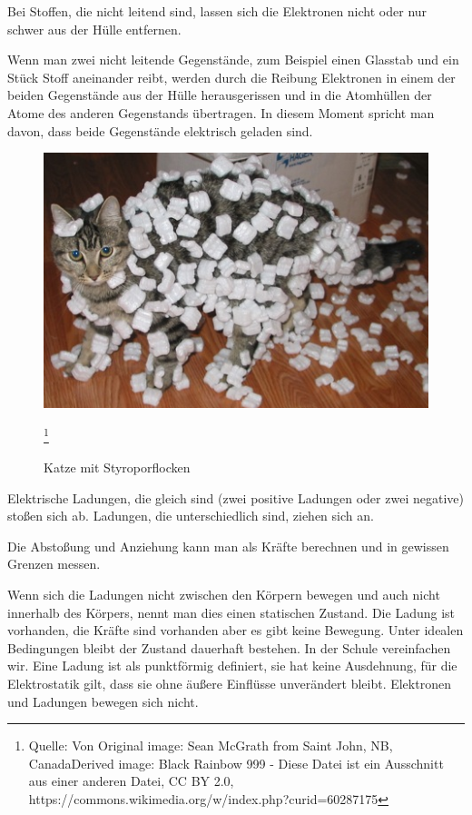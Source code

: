 \documentclass[a4paper,10pt]{scrreprt}
\begin{document}
Bei Stoffen, die nicht leitend sind, lassen sich die Elektronen nicht oder nur schwer aus der Hülle entfernen.

Wenn man zwei nicht leitende Gegenstände, zum Beispiel einen Glasstab und ein Stück Stoff aneinander reibt, werden durch die Reibung Elektronen in einem der beiden Gegenstände aus der Hülle herausgerissen und in die Atomhüllen der Atome des anderen Gegenstands übertragen. In diesem Moment spricht man davon, dass beide Gegenstände elektrisch geladen sind.

\begin{figure}[htb]
 \includegraphics{Cat_demonstrating_static_cling_with_styrofoam_peanuts.jpeg}
 \caption{Katze mit Styroporflocken}
 \label{abb:CatWidthStyropor}
 \footnote{Quelle: Von Original image: Sean McGrath from Saint John, NB, CanadaDerived image: Black Rainbow 999 - Diese Datei ist ein Ausschnitt aus einer anderen Datei, CC BY 2.0, https://commons.wikimedia.org/w/index.php?curid=60287175}
\end{figure}

Elektrische Ladungen, die gleich sind (zwei positive Ladungen oder zwei negative) stoßen sich ab. Ladungen, die unterschiedlich sind, ziehen sich an.

Die Abstoßung und Anziehung kann man als Kräfte berechnen und in gewissen Grenzen messen.

Wenn sich die Ladungen nicht zwischen den Körpern bewegen und auch nicht innerhalb des Körpers, nennt man dies einen statischen Zustand. Die Ladung ist vorhanden, die Kräfte sind vorhanden aber es gibt keine Bewegung. Unter idealen Bedingungen bleibt der Zustand dauerhaft bestehen. In der Schule vereinfachen wir. Eine Ladung ist als punktförmig definiert, sie hat keine Ausdehnung, für die Elektrostatik gilt, dass sie ohne äußere Einflüsse unverändert bleibt. Elektronen und Ladungen bewegen sich nicht.
\end{document}
